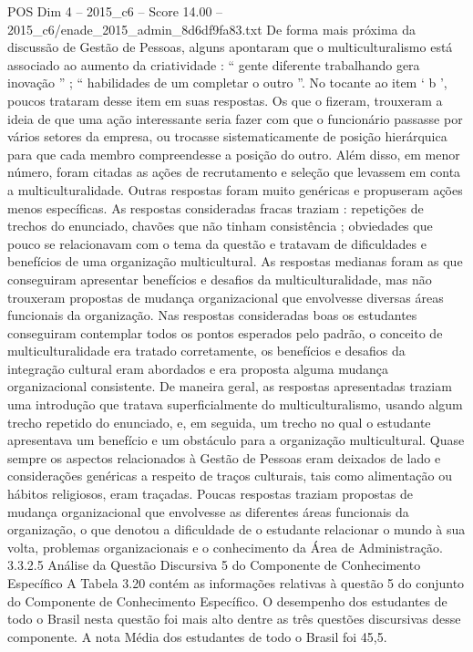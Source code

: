 \begin{textsample}{POS Dim 4 – 2015\_c6 – Score 14.00 – 2015\_c6/enade\_2015\_admin\_8d6df9fa83.txt}
De forma mais próxima da discussão de Gestão de Pessoas, alguns apontaram que o multiculturalismo está associado ao aumento da criatividade : “ gente diferente trabalhando gera inovação ” ; “ habilidades de um completar o outro ”.
No tocante ao item ‘ b ’, poucos trataram desse item em suas respostas.
Os que o fizeram, trouxeram a ideia de que uma ação interessante seria fazer com que o funcionário passasse por vários setores da empresa, ou trocasse sistematicamente de posição hierárquica para que cada membro compreendesse a posição do outro.
Além disso, em menor número, foram citadas as ações de recrutamento e seleção que levassem em conta a multiculturalidade.
Outras respostas foram muito genéricas e propuseram ações menos específicas.
As respostas consideradas fracas traziam : repetições de trechos do enunciado, chavões que não tinham consistência ; obviedades que pouco se relacionavam com o tema da questão e tratavam de dificuldades e benefícios de uma organização multicultural.
As respostas medianas foram as que conseguiram apresentar benefícios e desafios da multiculturalidade, mas não trouxeram propostas de mudança organizacional que envolvesse diversas áreas funcionais da organização.
Nas respostas consideradas boas os estudantes conseguiram contemplar todos os pontos esperados pelo padrão, o conceito de multiculturalidade era tratado corretamente, os benefícios e desafios da integração cultural eram abordados e era proposta alguma mudança organizacional consistente.
De maneira geral, as respostas apresentadas traziam uma introdução que tratava superficialmente do multiculturalismo, usando algum trecho repetido do enunciado, e, em seguida, um trecho no qual o estudante apresentava um benefício e um obstáculo para a organização multicultural.
Quase sempre os aspectos relacionados à Gestão de Pessoas eram deixados de lado e considerações genéricas a respeito de traços culturais, tais como alimentação ou hábitos religiosos, eram traçadas.
Poucas respostas traziam propostas de mudança organizacional que envolvesse as diferentes áreas funcionais da organização, o que denotou a dificuldade de o estudante relacionar o mundo à sua volta, problemas organizacionais e o conhecimento da Área de Administração. 3.3.2.5 Análise da Questão Discursiva 5 do Componente de Conhecimento Específico A Tabela 3.20 contém as informações relativas à questão 5 do conjunto do Componente de Conhecimento Específico.
O desempenho dos estudantes de todo o Brasil nesta questão foi mais alto dentre as três questões discursivas desse componente.
A nota Média dos estudantes de todo o Brasil foi 45,5.

\end{textsample}
